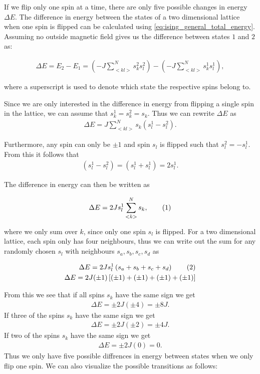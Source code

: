 \documentclass[reprint,english,notitlepage]{revtex4-1}  %
\newcommand\numberthis{\addtocounter{equation}{1}\tag{\theequation}}
\begin{document}
If we flip only one spin at a time, there are only five possible changes in energy $\Delta E$. The difference in energy between the states of a two dimensional lattice when one spin is flipped can be calculated using \eqref{eq:ising_general_total_energy}. Assuming no outside magnetic field gives us the difference between states \(1\) and \(2\) as:

\begin{align*}
	\Delta E = E_{2} - E_{1} = \left(-J \sum\limits_{<kl>}^N s_k^{2} s_l^{2}\right) -
	\left(-J \sum\limits_{<kl>}^N s_k^{1} s_l^{1}\right),
\end{align*}

where a superscript is used to denote which state the respective spins belong to.

Since we are only interested in the difference in energy from flipping a single spin in the lattice, we can assume that \(s_{k}^{1} = s_{k}^{2} = s_{k}\). Thus we can rewrite \(\Delta E\) as
\begin{align*}
 	\Delta E = J \sum_{<kl>}^{N} s_{k} \left(s_{l}^{1} - s_{l}^{2}\right).
\end{align*}

Furthermore, any spin can only be \(\pm 1\) and spin \(s_{l}\) is flipped such that \(s_{l}^{2} = -s_{l}^{1}\). From this it follows that \begin{align*}
	\left(s_{l}^{1} - s_{l}^{2}\right) = \left(s_{l}^{1} + s_{l}^{1}\right) = 2s_{l}^{1}.
\end{align*}

The difference in energy can then be written as

\begin{align*}
 	\Delta E = 2Js_{l}^{1} \sum_{<k>}^{N} s_{k}, \numberthis \label{eq:delta_e}
\end{align*}

where we only sum over \(k\), since only one spin \(s_{l}\) is flipped.
For a two dimensional lattice, each spin only has four neighbours, thus we can write out the sum for any randomly chosen \(s_{l}\) with neighbours \(s_{a}, s_{b}, s_{c}, s_{d}\) as

\begin{align*}
	\Delta E = 2Js_{l}^{1}\left(s_{a} + s_{b} + s_{c} + s_{d}\right) \numberthis \label{eq:singleflip_energy_change} \\
	\Delta E = 2J(\pm 1)\left[(\pm 1) + (\pm 1) + (\pm 1) + (\pm 1)\right]
\end{align*}

From this we see that if all spins \(s_{k}\) have the same sign we get
\begin{align*}
	\Delta E = \pm 2J(\pm 4) = \pm 8J.
\end{align*}
If three of the spins \(s_{k}\) have the same sign we get
\begin{align*}
	\Delta E = \pm 2J(\pm 2) = \pm 4J.
\end{align*}
If two of the spins \(s_{k}\) have the same sign we get
\begin{align*}
	\Delta E = \pm 2J(0) = 0.
\end{align*}
Thus we only have five possible diffrences in energy between states when we only flip one spin. We can also visualize the possible transitions as follows:
\end{document}
